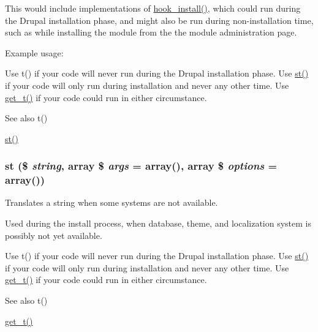 This would include implementations of \hyperlink{group__hooks_ga1ecdb5a2a046ea63dc790c3ed90338e5}{hook\_\-install()}, which could run during the Drupal installation phase, and might also be run during non-\/installation time, such as while installing the module from the the module administration page.

Example usage: 


Use t() if your code will never run during the Drupal installation phase. Use \hyperlink{group__sanitization_gabc78d1b88aa8081093abbbf71a516c7c}{st()} if your code will only run during installation and never any other time. Use \hyperlink{group__sanitization_gaa50232f577883a48731fc93530628a79}{get\_\-t()} if your code could run in either circumstance.

\begin{DoxySeeAlso}{See also}
t() 

\hyperlink{group__sanitization_gabc78d1b88aa8081093abbbf71a516c7c}{st()} 
\end{DoxySeeAlso}
\hypertarget{group__sanitization_gabc78d1b88aa8081093abbbf71a516c7c}{
\subsubsection[{st}]{\setlength{\rightskip}{0pt plus 5cm}st (\$ {\em string}, \/  array \$ {\em args} = {\ttfamily array()}, \/  array \$ {\em options} = {\ttfamily array()})}}
\label{group__sanitization_gabc78d1b88aa8081093abbbf71a516c7c}
Translates a string when some systems are not available.

Used during the install process, when database, theme, and localization system is possibly not yet available.

Use t() if your code will never run during the Drupal installation phase. Use \hyperlink{group__sanitization_gabc78d1b88aa8081093abbbf71a516c7c}{st()} if your code will only run during installation and never any other time. Use \hyperlink{group__sanitization_gaa50232f577883a48731fc93530628a79}{get\_\-t()} if your code could run in either circumstance.

\begin{DoxySeeAlso}{See also}
t() 

\hyperlink{group__sanitization_gaa50232f577883a48731fc93530628a79}{get\_\-t()} 
\end{DoxySeeAlso}

